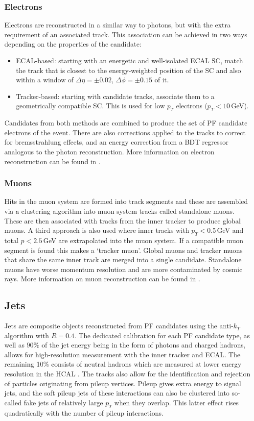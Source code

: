 \subsubsection{Electrons}
Electrons are reconstructed in a similar way to photons, but with the extra requirement of an associated track. This association can be achieved in two ways depending on the properties of the candidate:
\begin{itemize}
    \item ECAL-based: starting with an energetic and well-isolated ECAL SC, match the track that is closest to the energy-weighted position of the SC and also within a window of $\Delta\eta=\pm{0.02}$, $\Delta\phi=\pm{0.15}$ of it.
    \item Tracker-based: starting with candidate tracks, associate them to a geometrically compatible SC. This is used for low $p_{T}$ electrons ($p_{T} < 10$\,GeV).
\end{itemize}
Candidates from both methods are combined to produce the set of PF candidate electrons of the event. 
There are also corrections applied to the tracks to correct for bremsstrahlung effects, and an energy correction from a BDT regressor analogous to the photon reconstruction. 
More information on electron reconstruction can be found in \cite{ElectronReco}.

\subsubsection{Muons}
Hits in the muon system are formed into track segments and these are assembled via a clustering algorithm into muon system tracks called standalone muons. 
These are then associated with tracks from the inner tracker to produce global muons. A third approach is also used where inner tracks with $p_{T}<0.5$\,GeV and total $p < 2.5$\,GeV are extrapolated into the muon system. If a compatible muon segment is found this makes a `tracker muon'. Global muons and tracker muons that share the same inner track are merged into a single candidate. 
Standalone muons have worse momentum resolution and are more contaminated by cosmic rays.
More information on muon reconstruction can be found in \cite{MuonReco}.

\subsection{Jets}
Jets are composite objects reconstructed from PF candidates using the anti-$k_T$ algorithm \cite{AntiKt} with $R=0.4$. 
The dedicated calibration for each PF candidate type, as well as 90\% of the jet energy being in the form of photons and charged hadrons, allows for high-resolution measurement with the inner tracker and ECAL. The remaining 10\% consists of neutral hadrons which are measured at lower energy resolution in the HCAL \cite{JetPerformance}. 
The tracks also allow for the identification and rejection of particles originating from pileup vertices. Pileup gives extra energy to signal jets, and the soft pileup jets of these interactions can also be clustered into so-called fake jets of relatively large $p_{T}$ when they overlap. This latter effect rises quadratically with the number of pileup interactions. 


